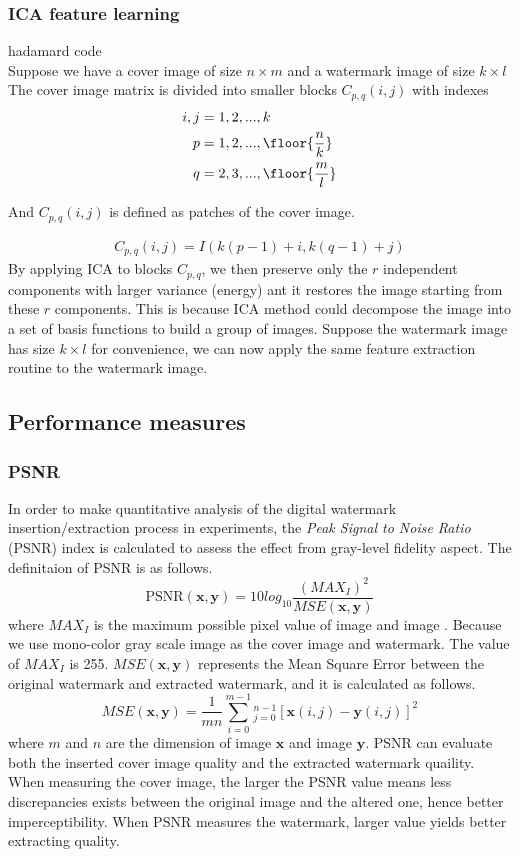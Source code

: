 \subsubsection{ICA feature learning}
hadamard code\\
Suppose we have a cover image of size $n\times m$ and a watermark image of size $k\times l$ The cover image matrix is divided into smaller blocks $C_{p,q}(i,j)$ with indexes
\begin{align}
    i,j &= 1,2,...,k\\
    p &= 1,2,...,\floor{\frac{n}{k}}\\ 
    q &= 2,3,...,\floor{\frac{m}{l}} 
\end{align}

And $C_{p,q}(i,j)$ is defined as patches of the cover image.

\begin{align}
    C_{p,q}(i,j) = I(k(p-1)+i, k(q-1)+j)
\end{align}
By applying ICA to blocks $C_{p,q}$, we then preserve only the $r$ independent components with larger variance (energy) ant it restores the image starting from these $r$ components. This is because ICA method could decompose the image into a set of basis functions to build a group of images. Suppose the watermark image has size $k \times l$ for convenience, we can now apply the same feature extraction routine to the watermark image.

\subsection{Performance measures}
\subsubsection{PSNR}
In order to make quantitative analysis of the digital watermark insertion/extraction process in experiments, the\textit{ Peak Signal to Noise Ratio} (PSNR) index is calculated to assess the effect from gray-level fidelity aspect. The definitaion of PSNR is as follows.
\begin{equation}
    \text{PSNR}(\mathbf{x,y}) = 10log_{10}\frac{(MAX_I)^2}{MSE(\mathbf{x,y})} 
\end{equation}
where $MAX_I$ is the maximum possible pixel value of image  and image . Because we use mono-color gray scale image as the cover image and watermark. The value of $MAX_I$ is 255. $MSE(\mathbf{x,y})$ represents the Mean Square Error between the original watermark and extracted watermark, and it is calculated as follows.
\begin{equation}
    MSE(\mathbf{x,y}) =  \frac{1}{mn}\sum_{i=0}^{m-1}_{j=0}^{n-1}[\mathbf{x}(i,j) - \mathbf{y}(i,j)]^2
\end{equation}
where $m$ and $n$ are the dimension of image $\mathbf{x}$ and image $\mathbf{y}$. PSNR can evaluate both the inserted cover image quality and the extracted watermark quaility. When measuring the cover image, the larger the PSNR value means less discrepancies exists between the original image and the altered one, hence better imperceptibility. When PSNR measures the watermark, larger value yields better extracting quality.

